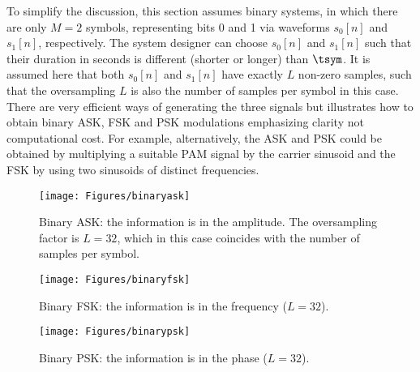 To simplify the discussion, this section assumes binary systems, in which there are only $M=2$ symbols, representing  bits 0 and 1 via waveforms $s_0[n]$ and $s_1[n]$, respectively.
The system designer can choose $s_0[n]$ and $s_1[n]$ such that their duration in seconds is different (shorter or longer) than $\tsym$. 
It is assumed here that both $s_0[n]$ and $s_1[n]$ have exactly $L$ non-zero samples, such that the oversampling $L$ is also the number of samples per symbol in this case. There are very efficient ways of generating the three signals but
 illustrates how to obtain binary ASK, FSK and PSK modulations emphasizing clarity not computational cost. For example, alternatively, the ASK and PSK could be obtained by multiplying a suitable PAM signal by the carrier sinusoid and the FSK by using two sinusoids of distinct frequencies.




\begin{figure}[htbp]
\centering
\texttt{[image: Figures/binaryask]}
\caption[{Binary ASK: the information is in the amplitude.}]{Binary ASK: the information is in the amplitude. The oversampling factor is $L=32$, which in this case coincides with the number of samples per symbol.\label{fig:binaryask}}
\end{figure}

\begin{figure}[htbp]
\centering
\texttt{[image: Figures/binaryfsk]}
\caption{Binary FSK: the information is in the frequency ($L=32$).\label{fig:binaryfsk}}
\end{figure}

\begin{figure}[htbp]
\centering
\texttt{[image: Figures/binarypsk]}
\caption{Binary PSK: the information is in the phase ($L=32$).\label{fig:binarypsk}}
\end{figure}

